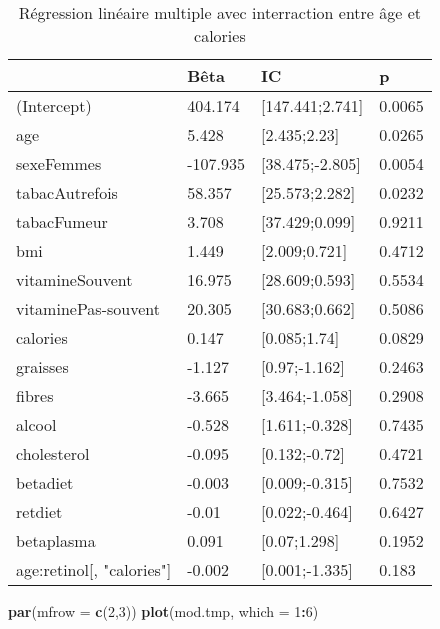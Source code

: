 \documentclass[]{article}
\newenvironment{Shaded}{\begin{snugshade}}{\end{snugshade}}
\newcommand{\KeywordTok}[1]{\textcolor[rgb]{0.13,0.29,0.53}{\textbf{#1}}}
\newcommand{\DataTypeTok}[1]{\textcolor[rgb]{0.13,0.29,0.53}{#1}}
\newcommand{\DecValTok}[1]{\textcolor[rgb]{0.00,0.00,0.81}{#1}}
\newcommand{\OperatorTok}[1]{\textcolor[rgb]{0.81,0.36,0.00}{\textbf{#1}}}
\newcommand{\NormalTok}[1]{#1}
\begin{document}
\begin{table}

\caption{\label{tab:unnamed-chunk-52}Régression linéaire multiple avec interraction entre âge et calories}
\centering
\begin{tabular}[t]{l|l|l|l}
\hline
  & Bêta & IC & p\\
\hline
\rowcolor[HTML]{BBD2E1}  (Intercept) & 404.174 & [147.441;2.741] & 0.0065\\
\hline
age & 5.428 & [2.435;2.23] & 0.0265\\
\hline
\rowcolor[HTML]{BBD2E1}  sexeFemmes & -107.935 & [38.475;-2.805] & 0.0054\\
\hline
tabacAutrefois & 58.357 & [25.573;2.282] & 0.0232\\
\hline
\rowcolor[HTML]{BBD2E1}  tabacFumeur & 3.708 & [37.429;0.099] & 0.9211\\
\hline
bmi & 1.449 & [2.009;0.721] & 0.4712\\
\hline
\rowcolor[HTML]{BBD2E1}  vitamineSouvent & 16.975 & [28.609;0.593] & 0.5534\\
\hline
vitaminePas-souvent & 20.305 & [30.683;0.662] & 0.5086\\
\hline
\rowcolor[HTML]{BBD2E1}  calories & 0.147 & [0.085;1.74] & 0.0829\\
\hline
graisses & -1.127 & [0.97;-1.162] & 0.2463\\
\hline
\rowcolor[HTML]{BBD2E1}  fibres & -3.665 & [3.464;-1.058] & 0.2908\\
\hline
alcool & -0.528 & [1.611;-0.328] & 0.7435\\
\hline
\rowcolor[HTML]{BBD2E1}  cholesterol & -0.095 & [0.132;-0.72] & 0.4721\\
\hline
betadiet & -0.003 & [0.009;-0.315] & 0.7532\\
\hline
\rowcolor[HTML]{BBD2E1}  retdiet & -0.01 & [0.022;-0.464] & 0.6427\\
\hline
betaplasma & 0.091 & [0.07;1.298] & 0.1952\\
\hline
\rowcolor[HTML]{BBD2E1}  age:retinol[, "calories"] & -0.002 & [0.001;-1.335] & 0.183\\
\hline
\end{tabular}
\end{table}

\begin{Shaded}
\begin{Highlighting}[]
\KeywordTok{par}\NormalTok{(}\DataTypeTok{mfrow =} \KeywordTok{c}\NormalTok{(}\DecValTok{2}\NormalTok{,}\DecValTok{3}\NormalTok{))}
\KeywordTok{plot}\NormalTok{(mod.tmp, }\DataTypeTok{which =} \DecValTok{1}\OperatorTok{:}\DecValTok{6}\NormalTok{)}
\end{Highlighting}
\end{Shaded}
\end{document}

